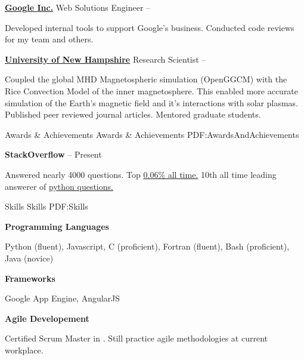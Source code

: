 \documentclass[letterpaper,MMMyyyy,nonstopmode]{simpleresumecv}
\begin{document}
\begin{Body}
\BigGap
\Entry
\href {https://google.com}{\textbf{Google Inc.}}
\Gap
\BulletItem
Web Solutions Engineer
\hfill
{} -- 
\begin{Detail}
\SubBulletItem
Developed internal tools to support Google's business.
\SubBulletItem
Conducted code reviews for my team and others.
\end{Detail}

\BigGap
\Entry
\href {http://www.unh.edu/}{\textbf{University of New Hampshire}}
\Gap
\BulletItem
Research Scientist
\hfill
{} -- 
\begin{Detail}
\SubBulletItem
Coupled the global MHD Magnetospheric simulation (OpenGGCM) with the Rice Convection
Model of the inner magnetosphere.  This enabled more accurate simulation of the
Earth's magnetic field and it's interactions with solar plasmas.
\SubBulletItem
Published peer reviewed journal articles.
\SubBulletItem
Mentored graduate students.
\end{Detail}



\Section
{Awards \&\newline
Achievements}
{Awards \& Achievements}
{PDF:AwardsAndAchievements}

\Entry
\textbf{StackOverflow}
\hfill
{} -- Present
\begin{Detail}
\Item
Answered nearly 4000 questions.
\Item
Top \href{http://stackoverflow.com/users/748858/mgilson}{0.06\% all time.}
\Item
10th all time leading answerer of \href{http://stackoverflow.com/tags/python/topusers}{python questions.}
\end{Detail}



\Section
{Skills}
{Skills}
{PDF:Skills}

\Entry
\textbf{Programming Languages}
\begin{Detail}
\Item Python (fluent), Javascript, C (proficient), Fortran (fluent), Bash (proficient), Java (novice)
\end{Detail}

\BigGap
\Entry
\textbf{Frameworks}
\begin{Detail}
\Item Google App Engine, AngularJS
\end{Detail}

\BigGap
\Entry
\textbf{Agile Developement}
\begin{Detail}
\Item Certified Scrum Master in .  Still practice agile methodologies
at current workplace.
\end{Detail}


\end{Body}
\end{document}
